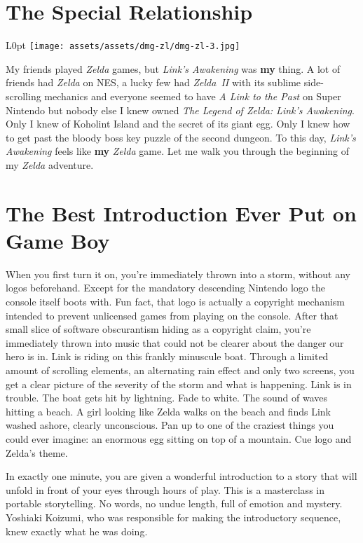 \documentclass{book}
\begin{document}
\FloatBarrier\needspace{5pt}\section*{The Special Relationship}\nopagebreak[4]

\begin{wrapfigure}{L}{0pt} \texttt{[image: assets/assets/dmg-zl/dmg-zl-3.jpg]}\end{wrapfigure}
My friends played \emph{Zelda} games, but \emph{Link’s Awakening} was \textbf{my} thing. A lot of friends had \emph{Zelda} on NES, a lucky few had \emph{Zelda II} with its sublime side-scrolling mechanics and everyone seemed to have \emph{A Link to the Past} on Super Nintendo but nobody else I knew owned \emph{The Legend of Zelda: Link’s Awakening}. Only I knew of Koholint Island and the secret of its giant egg. Only I knew how to get past the bloody boss key puzzle of the second dungeon. To this day, \emph{Link’s Awakening} feels like \textbf{my} \emph{Zelda} game. Let me walk you through the beginning of my \emph{Zelda} adventure.

\FloatBarrier\needspace{5pt}\section*{The Best Introduction Ever Put on Game Boy}\nopagebreak[4]

When you first turn it on, you’re immediately thrown into a storm, without any logos beforehand. Except for the mandatory descending Nintendo logo the console itself boots with. Fun fact, that logo is actually a copyright mechanism intended to prevent unlicensed games from playing on the console. After that small slice of software obscurantism hiding as a copyright claim, you’re immediately thrown into music that could not be clearer about the danger our hero is in. Link is riding on this frankly minuscule boat. Through a limited amount of scrolling elements, an alternating rain effect and only two screens, you get a clear picture of the severity of the storm and what is happening. Link is in trouble. The boat gets hit by lightning. Fade to white. The sound of waves hitting a beach. A girl looking like Zelda walks on the beach and finds Link washed ashore, clearly unconscious. Pan up to one of the craziest things you could ever imagine: an enormous egg sitting on top of a mountain. Cue logo and Zelda’s theme.



In exactly one minute, you are given a wonderful introduction to a story that will unfold in front of your eyes through hours of play. This is a masterclass in portable storytelling. No words, no undue length, full of emotion and mystery. Yoshiaki Koizumi, who was responsible for making the introductory sequence, knew exactly what he was doing.
\end{document}
